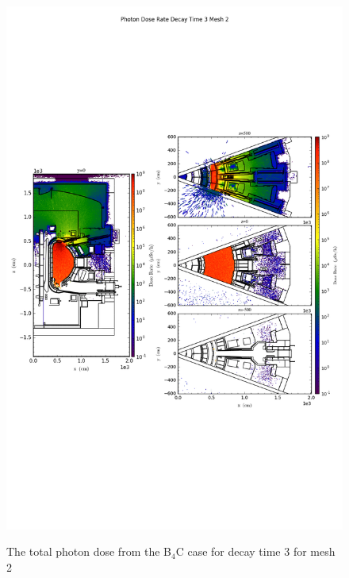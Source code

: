 \begin{figure}[ht!]
\centering
\includegraphics[trim={0cm 9cm 0cm 10cm},clip,scale=0.75]{../plots/final_model_nob4c/Photon_Dose_Rate_Decay_Time_3_Mesh_2.png}
\label{fig:photons_dc3_no4bc_m2_flux}
\caption{The total photon dose from the B$_4$C case for decay time 3 for mesh 2}
\end{figure}
